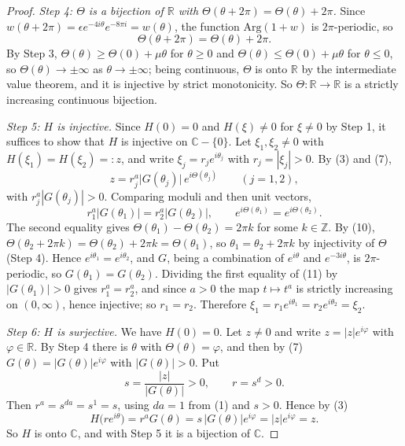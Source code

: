 \begin{proof}
\emph{Step 4: $\Theta$ is a bijection of $\mathbb{R}$ with $\Theta(\theta+2\pi)=\Theta(\theta)+2\pi$.}
Since $w(\theta+2\pi)=\epsilon e^{-4i\theta}e^{-8\pi i}=w(\theta)$, the function
$\mathrm{Arg}(1+w)$ is $2\pi$-periodic, so
\begin{equation}\tag{10}
  \Theta(\theta+2\pi)=\Theta(\theta)+2\pi .
\end{equation}
By Step 3, $\Theta(\theta)\ge\Theta(0)+\mu\theta$ for $\theta\ge0$ and
$\Theta(\theta)\le\Theta(0)+\mu\theta$ for $\theta\le0$, so
$\Theta(\theta)\to\pm\infty$ as $\theta\to\pm\infty$; being continuous, $\Theta$
is onto $\mathbb{R}$ by the intermediate value theorem, and it is injective by
strict monotonicity.  So $\Theta\colon\mathbb{R}\to\mathbb{R}$ is a strictly
increasing continuous bijection.

\emph{Step 5: $H$ is injective.}  Since $H(0)=0$ and $H(\xi)\neq0$ for
$\xi\neq0$ by Step 1, it suffices to show that $H$ is injective on
$\mathbb{C}-\{0\}$.  Let $\xi_1,\xi_2\neq0$ with $H(\xi_1)=H(\xi_2)=:z$, and
write $\xi_j=r_je^{i\theta_j}$ with $r_j=|\xi_j|>0$.  By (3) and (7),
\[
  z=r_j^{a}\bigl|G(\theta_j)\bigr|\,e^{i\Theta(\theta_j)}\qquad(j=1,2),
\]
with $r_j^{a}|G(\theta_j)|>0$.  Comparing moduli and then unit vectors,
\begin{equation}\tag{11}
  r_1^{a}\bigl|G(\theta_1)\bigr|=r_2^{a}\bigl|G(\theta_2)\bigr|,
  \qquad e^{i\Theta(\theta_1)}=e^{i\Theta(\theta_2)} .
\end{equation}
The second equality gives $\Theta(\theta_1)-\Theta(\theta_2)=2\pi k$ for some
$k\in\mathbb{Z}$.  By (10), $\Theta(\theta_2+2\pi k)=\Theta(\theta_2)+2\pi k
=\Theta(\theta_1)$, so $\theta_1=\theta_2+2\pi k$ by injectivity of $\Theta$
(Step 4).  Hence $e^{i\theta_1}=e^{i\theta_2}$, and $G$, being a combination of
$e^{i\theta}$ and $e^{-3i\theta}$, is $2\pi$-periodic, so
$G(\theta_1)=G(\theta_2)$.  Dividing the first equality of (11) by
$|G(\theta_1)|>0$ gives $r_1^{a}=r_2^{a}$, and since $a>0$ the map
$t\mapsto t^{a}$ is strictly increasing on $(0,\infty)$, hence injective; so
$r_1=r_2$.  Therefore
$\xi_1=r_1e^{i\theta_1}=r_2e^{i\theta_2}=\xi_2$.

\emph{Step 6: $H$ is surjective.}  We have $H(0)=0$.  Let $z\neq0$ and write
$z=|z|e^{i\varphi}$ with $\varphi\in\mathbb{R}$.  By Step 4 there is $\theta$
with $\Theta(\theta)=\varphi$, and then by (7)
$G(\theta)=|G(\theta)|e^{i\varphi}$ with $|G(\theta)|>0$.  Put
\[
  s=\frac{|z|}{|G(\theta)|}>0,\qquad r=s^{d}>0 .
\]
Then $r^{a}=s^{da}=s^{1}=s$, using $da=1$ from (1) and $s>0$.  Hence by (3)
\[
  H\bigl(re^{i\theta}\bigr)=r^{a}G(\theta)=s\,\bigl|G(\theta)\bigr|e^{i\varphi}
  =|z|e^{i\varphi}=z .
\]
So $H$ is onto $\mathbb{C}$, and with Step 5 it is a bijection of $\mathbb{C}$.


\end{proof}
